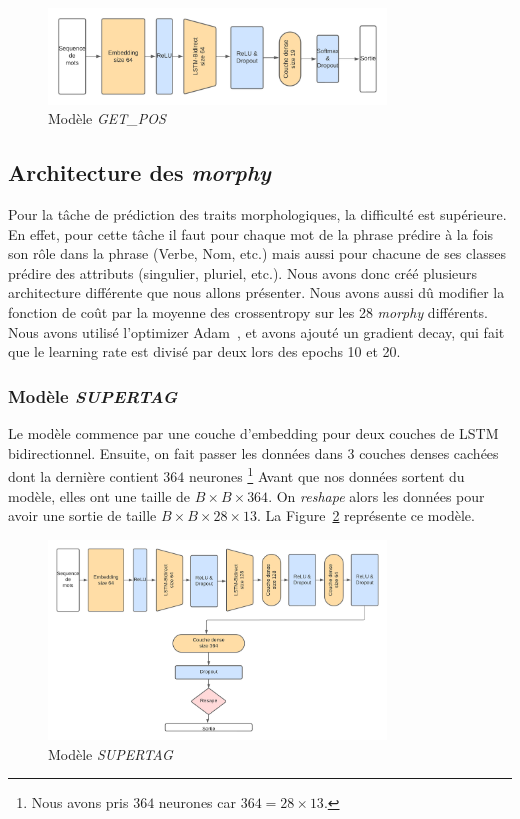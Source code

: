 \documentclass[a4paper]{article}
\begin{document}
\begin{figure}[H]
    \centering
    \includegraphics[width=0.8\textwidth]{get_pos.png}
    \caption{Modèle \textit{GET\_POS}}
    \label{fig: model getpos}
\end{figure} 

\subsection{Architecture des \textit{morphy}}

Pour la tâche de prédiction des traits morphologiques, la difficulté est supérieure. En effet, pour cette tâche 
il faut pour chaque mot de la phrase prédire à la fois son rôle dans la phrase (Verbe, Nom, etc.) mais aussi 
pour chacune de ses classes prédire des attributs (singulier, pluriel, etc.). Nous avons donc créé plusieurs 
architecture différente que nous allons présenter. Nous avons aussi dû modifier la fonction de coût par 
la moyenne des crossentropy sur les 28 \textit{morphy} différents. Nous avons utilisé l'optimizer Adam~\cite{kingma2014adam},
et avons ajouté un gradient decay, qui fait que le learning rate est divisé par deux lors des epochs 10 et 20.

\subsubsection{Modèle \textit{SUPERTAG}}

Le modèle commence par une couche d'embedding pour deux couches de LSTM bidirectionnel. Ensuite, on fait passer les données 
dans 3 couches denses cachées dont la dernière contient $364$ neurones
\footnote{Nous avons pris $364$ neurones car $364 = 28 \times 13$.}
Avant que nos données sortent du modèle, elles ont une
taille de $B \times B \times 364$. On \textit{reshape} alors les données pour avoir une sortie de taille 
$B \times B \times 28 \times 13$. La Figure~\ref{fig: model supertag} représente ce modèle.

\begin{figure}[!ht]
    \centering
    \includegraphics[width=0.8\textwidth]{get_morphy_supertag.png}
    \caption{Modèle \textit{SUPERTAG}}
    \label{fig: model supertag}
\end{figure}
\end{document}
